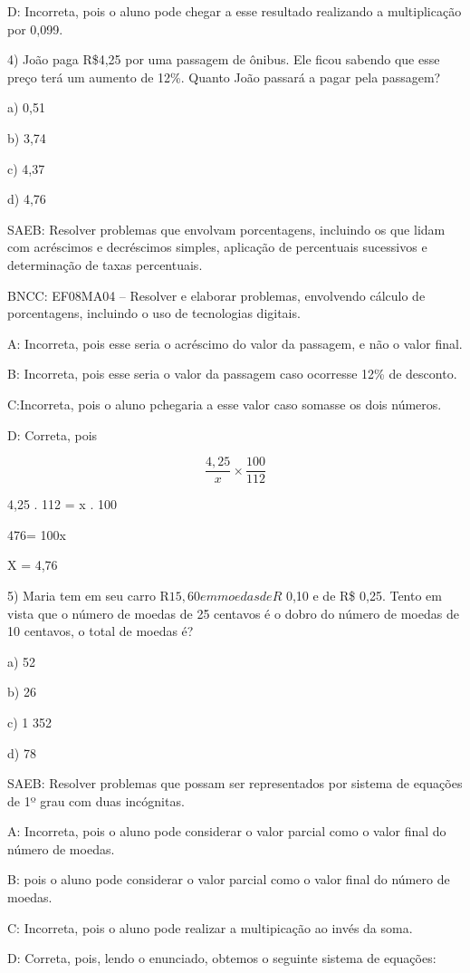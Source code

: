 D: Incorreta, pois o aluno pode chegar a esse resultado realizando a
multiplicação por 0,099.

4) João paga R\$4,25 por uma passagem de ônibus. Ele ficou sabendo que
esse preço terá um aumento de 12\%. Quanto João passará a pagar pela
passagem?

a) 0,51

b) 3,74

c) 4,37

d) 4,76

SAEB: Resolver problemas que envolvam porcentagens, incluindo os que
lidam com acréscimos e decréscimos simples, aplicação de percentuais
sucessivos e determinação de taxas percentuais.

BNCC: EF08MA04 -- Resolver e elaborar problemas, envolvendo cálculo de
porcentagens, incluindo o uso de tecnologias digitais.

A: Incorreta, pois esse seria o acréscimo do valor da passagem, e não o
valor final.

B: Incorreta, pois esse seria o valor da passagem caso ocorresse 12\% de
desconto.

C:Incorreta, pois o aluno pchegaria a esse valor caso somasse os dois
números.

D: Correta, pois

\[\frac {4,25}{x} \times \frac {100}{112}\]

4,25 . 112 = x . 100

476= 100x

X = 4,76

5) Maria tem em seu carro R\(15,60 em moedas de R\) 0,10 e de R\$ 0,25.
Tento em vista que o número de moedas de 25 centavos é o dobro do número
de moedas de 10 centavos, o total de moedas é?

a) 52

b) 26

c) 1 352

d) 78

SAEB: Resolver problemas que possam ser representados por sistema de
equações de 1º grau com duas incógnitas.

A: Incorreta, pois o aluno pode considerar o valor parcial como o valor
final do número de moedas.

B: pois o aluno pode considerar o valor parcial como o valor final do
número de moedas.

C: Incorreta, pois o aluno pode realizar a multipicação ao invés da
soma.

D: Correta, pois, lendo o enunciado, obtemos o seguinte sistema de
equações:

